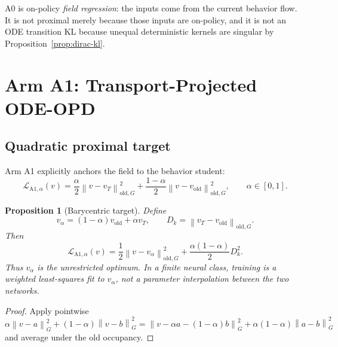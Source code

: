\documentclass[11pt,a4paper]{article}
\newcommand{\norm}[1]{\left\lVert #1 \right\rVert}
\newcommand{\vold}{v_{\mathrm{old}}}
\newcommand{\vT}{v_T}
\theoremstyle{plain}
\newtheorem{proposition}[theorem]{Proposition}
\theoremstyle{definition}
\begin{document}
\begin{tcolorbox}[colback=gray!5,colframe=gray!55,title=Exact interpretation of Arm A0]
A0 is on-policy \emph{field regression}: the inputs come from the current behavior flow.  It is
not proximal merely because those inputs are on-policy, and it is not an ODE transition KL because
unequal deterministic kernels are singular by Proposition~\ref{prop:dirac-kl}.
\end{tcolorbox}

\section{Arm A1: Transport-Projected ODE-OPD}
\label{sec:a1}

\subsection{Quadratic proximal target}

Arm A1 explicitly anchors the field to the behavior student:
\begin{equation}
\mathcal L_{\mathrm{A1},\alpha}(v)
=
\frac{\alpha}{2}\norm{v-\vT}_{\mathrm{old},G}^2
+
\frac{1-\alpha}{2}\norm{v-\vold}_{\mathrm{old},G}^2,
\qquad
\alpha\in[0,1].
\label{eq:a1-loss}
\end{equation}

\begin{proposition}[Barycentric target]
\label{prop:a1-barycenter}
Define
\begin{equation}
v_\alpha=(1-\alpha)\vold+\alpha\vT,
\qquad
D_k=\norm{\vT-\vold}_{\mathrm{old},G}.
\label{eq:a1-target}
\end{equation}
Then
\begin{equation}
\mathcal L_{\mathrm{A1},\alpha}(v)
=
\frac12\norm{v-v_\alpha}_{\mathrm{old},G}^2
+
\frac{\alpha(1-\alpha)}{2}D_k^2 .
\label{eq:a1-square-completion}
\end{equation}
Thus $v_\alpha$ is the unrestricted optimum.  In a finite neural class, training is a weighted
least-squares fit to $v_\alpha$, not a parameter interpolation between the two networks.
\end{proposition}

\begin{proof}
Apply pointwise
\[
\alpha\norm{v-a}_G^2+(1-\alpha)\norm{v-b}_G^2
=
\norm{v-\alpha a-(1-\alpha)b}_G^2
+
\alpha(1-\alpha)\norm{a-b}_G^2
\]
and average under the old occupancy.
\end{proof}
\end{document}
